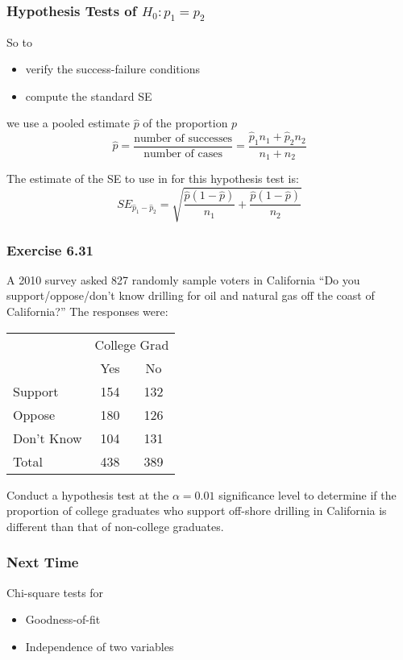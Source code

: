 \documentclass[handout]{beamer}
\newcommand{\blue}[1]{\textcolor{blue2}{#1}}
\newcommand{\phat}{\widehat{p}}
\begin{document}
\begin{frame}[fragile]
\frametitle{Hypothesis Tests of $H_0: p_1=p_2$}

So to
\begin{itemize}
\item verify the success-failure conditions
\item compute the standard SE
\end{itemize}
\pause we use a \blue{pooled estimate} $\widehat{p}$ of the proportion $p$
\[
\widehat{p} = \frac{\mbox{number of successes}}{\mbox{number of cases}} = \frac{\widehat{p}_1n_1 + \widehat{p}_2n_2}{n_1+n_2}
\]

\pause The estimate of the SE to use in for this hypothesis test is:
\[
SE_{\phat_1 - \phat_2} = \sqrt{\frac{\widehat{p}(1-\widehat{p})}{n_1} + \frac{\widehat{p}(1-\widehat{p})}{n_2}}
\]

\end{frame}


\begin{frame}[fragile]
\frametitle{Exercise 6.31}
A 2010 survey asked 827 randomly sample voters in California ``Do you support/oppose/don't know drilling for oil and natural gas off the coast of California?'' The responses were:

\begin{center}
\begin{tabular}{l|cc}
 & \multicolumn{2}{c}{College Grad} \\
 & Yes & No  \\
\hline
Support & 154 & 132  \\
Oppose & 180 & 126 \\
Don't Know & 104 & 131 \\
\hline
Total & 438 & 389 \\
\end{tabular}
\end{center}
\pause Conduct a hypothesis test at the $\alpha = 0.01$ significance level to determine if the proportion of college graduates who support off-shore drilling in California is different than that of non-college graduates.
\end{frame}


\begin{frame}[fragile]
\frametitle{Next Time}

Chi-square tests for
\begin{itemize}
\item Goodness-of-fit
\item Independence of two variables
\end{itemize}

\end{frame}
\end{document}
